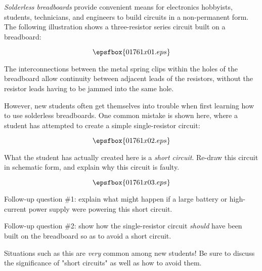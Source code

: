 

{\it Solderless breadboards} provide convenient means for electronics hobbyists, students, technicians, and engineers to build circuits in a non-permanent form.  The following illustration shows a three-resistor series circuit built on a breadboard:

$$\epsfbox{01761x01.eps}$$

The interconnections between the metal spring clips within the holes of the breadboard allow continuity between adjacent leads of the resistors, without the resistor leads having to be jammed into the same hole.

However, new students often get themselves into trouble when first learning how to use solderless breadboards.  One common mistake is shown here, where a student has attempted to create a simple single-resistor circuit:

$$\epsfbox{01761x02.eps}$$

What the student has actually created here is a {\it short circuit}.  Re-draw this circuit in schematic form, and explain why this circuit is faulty.







$$\epsfbox{01761x03.eps}$$

\vskip 10pt

Follow-up question \#1: explain what might happen if a large battery or high-current power supply were powering this short circuit.

\vskip 10pt

Follow-up question \#2: show how the single-resistor circuit {\it should} have been built on the breadboard so as to avoid a short circuit.







Situations such as this are {\it very} common among new students!  Be sure to discuss the significance of "short circuits" as well as how to avoid them.




